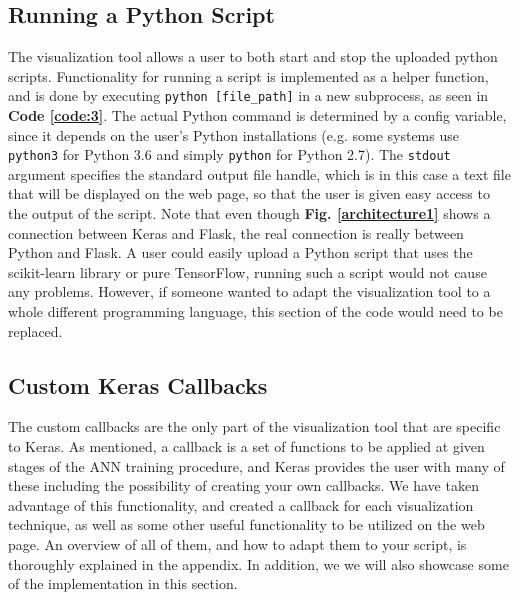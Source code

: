 \subsection{Running a Python Script}

The visualization tool allows a user to both start and stop the uploaded python scripts. Functionality for running a script is implemented as a helper function, and is done by executing \texttt{python [file\_path]} in a new subprocess, as seen in \textbf{Code \ref{code:3}}. The actual Python command is determined by a config variable, since it depends on the user's Python installations (e.g. some systems use \texttt{python3} for Python 3.6 and simply \texttt{python} for Python 2.7). The \texttt{stdout} argument specifies the standard output file handle, which is in this case a text file that will be displayed on the web page, so that the user is given easy access to the output of the script. Note that even though \textbf{Fig. \ref{architecture1}} shows a connection between Keras and Flask, the real connection is really between Python and Flask. A user could easily upload a Python script that uses the scikit-learn library or pure TensorFlow, running such a script would not cause any problems. However, if someone wanted to adapt the visualization tool to a whole different programming language, this section of the code would need to be replaced.


\subsection{Custom Keras Callbacks}

The custom callbacks are the only part of the visualization tool that are specific to Keras. As mentioned, a callback is a set of functions to be applied at given stages of the ANN training procedure, and Keras provides the user with many of these including the possibility of creating your own callbacks. We have taken advantage of this functionality, and created a callback for each visualization technique, as well as some other useful functionality to be utilized on the web page. An overview of all of them, and how to adapt them to your script, is thoroughly explained in the appendix. In addition, we we will also showcase some of the implementation in this section.

